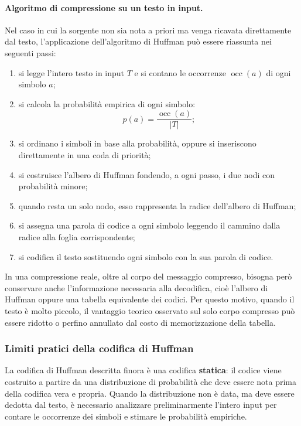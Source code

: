 \documentclass{article}
\theoremstyle{definition}
\numberwithin{equation}{section}
\begin{document}
\paragraph{Algoritmo di compressione su un testo in input.}
Nel caso in cui la sorgente non sia nota a priori ma venga ricavata direttamente dal testo, l'applicazione dell'algoritmo di Huffman può essere riassunta nei seguenti passi:
\begin{enumerate}
    \item si legge l'intero testo in input $T$ e si contano le occorrenze $\operatorname{occ}(a)$ di ogni simbolo $a$;
    \item si calcola la probabilità empirica di ogni simbolo:
          \[
              p(a)=\frac{\operatorname{occ}(a)}{|T|};
          \]
    \item si ordinano i simboli in base alla probabilità, oppure si inseriscono direttamente in una coda di priorità;
    \item si costruisce l'albero di Huffman fondendo, a ogni passo, i due nodi con probabilità minore;
    \item quando resta un solo nodo, esso rappresenta la radice dell'albero di Huffman;
    \item si assegna una parola di codice a ogni simbolo leggendo il cammino dalla radice alla foglia corrispondente;
    \item si codifica il testo sostituendo ogni simbolo con la sua parola di codice.
\end{enumerate}
In una compressione reale, oltre al corpo del messaggio compresso, bisogna però conservare anche l'informazione necessaria alla decodifica, cioè l'albero di Huffman oppure una tabella equivalente dei codici. Per questo motivo, quando il testo è molto piccolo, il vantaggio teorico osservato sul solo corpo compresso può essere ridotto o perfino annullato dal costo di memorizzazione della tabella.



\subsubsection{Limiti pratici della codifica di Huffman}
La codifica di Huffman descritta finora è una codifica \textbf{statica}: il codice viene costruito a partire da una distribuzione di probabilità che deve essere nota prima della codifica vera e propria. Quando la distribuzione non è data, ma deve essere dedotta dal testo, è necessario analizzare preliminarmente l'intero input per contare le occorrenze dei simboli e stimare le probabilità empiriche.
\end{document}

